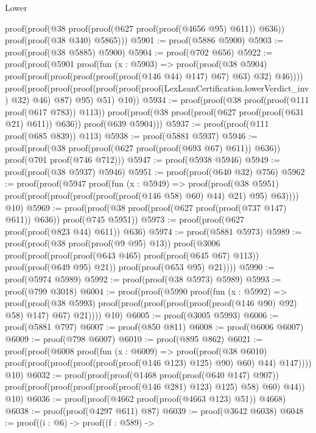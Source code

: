 \begin{lexlean}{Lower}
\begin{coremodule}
      proof(proof(@38 proof(proof(@627 proof(proof(@4656 @95) @611)) @636))
          proof(proof(@38 @340) @5865)))
@5901 := proof(@5886 @5900)
@5903 := proof(proof(@38 @5885) @5900)
@5904 := proof(@702 @656)
@5922 := proof(proof(@5901
        proof(fun (x : @5903) =>
          proof(proof(@38 @5904)
              proof(proof(proof(proof(proof(proof(@146 @44) @147) @67) @63) @32) @46))))
      proof(proof(proof(proof(proof(proof(proof(LexLeanCertification.lowerVerdict_inv) @32) @46)
                @87)
              @95)
            @51)
          @10))
@5934 := proof(proof(@38 proof(proof(@111 proof(@617 @783)) @113))
      proof(proof(@38 proof(proof(@627 proof(proof(@631 @21) @611)) @636)) proof(@639 @5904)))
@5937 := proof(proof(@111 proof(@685 @839)) @113)
@5938 := proof(@5881 @5937)
@5946 := proof(proof(@38 proof(proof(@627 proof(proof(@693 @67) @611)) @636))
      proof(@701 proof(@746 @712)))
@5947 := proof(@5938 @5946)
@5949 := proof(proof(@38 @5937) @5946)
@5951 := proof(proof(@640 @32) @756)
@5962 := proof(proof(@5947
        proof(fun (x : @5949) =>
          proof(proof(@38 @5951)
              proof(proof(proof(proof(proof(proof(@146 @58) @60) @44) @21) @95) @63))))
      @10)
@5969 := proof(proof(@38 proof(proof(@627 proof(proof(@737 @147) @611)) @636)) proof(@745 @5951))
@5973 := proof(proof(@627 proof(proof(@823 @44) @611)) @636)
@5974 := proof(@5881 @5973)
@5989 := proof(proof(@38 proof(proof(@9 @95) @13))
      proof(@3006
          proof(proof(proof(proof(@643 @465) proof(proof(@645 @67) @113))
                proof(proof(@649 @95) @21))
              proof(proof(@653 @95) @21))))
@5990 := proof(@5974 @5989)
@5992 := proof(proof(@38 @5973) @5989)
@5993 := proof(@799 @3018)
@6004 := proof(proof(@5990
        proof(fun (x : @5992) =>
          proof(proof(@38 @5993)
              proof(proof(proof(proof(proof(proof(@146 @90) @92) @58) @147) @67) @21))))
      @10)
@6005 := proof(@3005 @5993)
@6006 := proof(@5881 @797)
@6007 := proof(@850 @811)
@6008 := proof(@6006 @6007)
@6009 := proof(@798 @6007)
@6010 := proof(@895 @862)
@6021 := proof(proof(@6008
        proof(fun (x : @6009) =>
          proof(proof(@38 @6010)
              proof(proof(proof(proof(proof(proof(@146 @123) @125) @90) @60) @44) @147))))
      @10)
@6032 := proof(proof(proof(@1468 proof(proof(@640 @147) @907))
        proof(proof(proof(proof(proof(proof(@146 @281) @123) @125) @58) @60) @44))
      @10)
@6036 := proof(proof(@4662 proof(proof(@4663 @123) @51)) @4668)
@6038 := proof(proof(@4297 @611) @87)
@6039 := proof(@3642 @6038)
@6048 := proof((i : @6) ->
    proof((f : @589) ->

\end{coremodule}
\end{lexlean}
